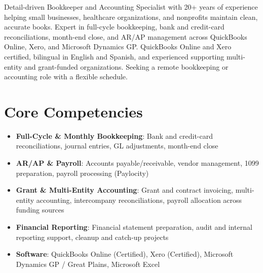 \documentclass[11pt,a4paper,sans]{moderncv}
\begin{document}
\makecvtitle


\vspace{6pt}
\small{Detail-driven Bookkeeper and Accounting Specialist with 20+ years of experience helping small businesses, healthcare organizations, and nonprofits maintain clean, accurate books. Expert in full-cycle bookkeeping, bank and credit-card reconciliations, month-end close, and AR/AP management across QuickBooks Online, Xero, and Microsoft Dynamics GP. QuickBooks Online and Xero certified, bilingual in English and Spanish, and experienced supporting multi-entity and grant-funded organizations. Seeking a remote bookkeeping or accounting role with a flexible schedule.}


\section{Core Competencies}
\vspace{1pt}
\begin{itemize}

\item \textbf{Full-Cycle \& Monthly Bookkeeping}: Bank and credit-card reconciliations, journal entries, GL adjustments, month-end close

\item \textbf{AR/AP \& Payroll}: Accounts payable/receivable, vendor management, 1099 preparation, payroll processing (Paylocity)

\item \textbf{Grant \& Multi-Entity Accounting}: Grant and contract invoicing, multi-entity accounting, intercompany reconciliations, payroll allocation across funding sources

\item \textbf{Financial Reporting}: Financial statement preparation, audit and internal reporting support, cleanup and catch-up projects

\item \textbf{Software}: QuickBooks Online (Certified), Xero (Certified), Microsoft Dynamics GP / Great Plains, Microsoft Excel

\end{itemize}
\end{document}
